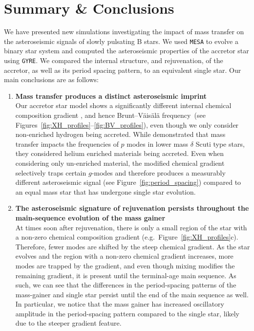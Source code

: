 \documentclass[desactivate]{aa}
\begin{document}
\section{Summary \& Conclusions} \label{sec:conclusion}

We have presented new simulations investigating the impact of mass transfer on the asteroseismic signals of slowly pulsating B stars. We used \texttt{MESA} to evolve a binary star system and computed the asteroseismic properties of the accretor star using \texttt{GYRE}. We compared the internal structure, and rejuvenation, of the accretor, as well as its period spacing pattern, to an equivalent single star. Our main conclusions are as follows:

\begin{enumerate}
    \setlength\itemsep{1em}
    \item \textbf{Mass transfer produces a distinct asteroseismic imprint}\\Our accretor star model shows a significantly different internal chemical composition gradient \citep[e.g.][]{Renzo+2021}, and hence Brunt–Väisälä frequency\ (see Figures~\ref{fig:XH_profiles}--\ref{fig:BV_profiles}), even though we only consider non-enriched hydrogen being accreted. While \citet{Miszuda+2021} demonstrated that mass transfer impacts the frequencies of $p$ modes in lower mass $\delta$ Scuti type stars, they considered helium enriched materials being accreted. Even when considering only un-enriched material, the modified chemical gradient selectively traps certain $g$-modes and therefore produces a measurably different asteroseismic signal (see Figure~\ref{fig:period_spacing}) compared to an equal mass star that has undergone single star evolution.
    \item {\bf The asteroseismic signature of rejuvenation persists throughout the main-sequence evolution of the mass gainer}\\ At times soon after rejuvenation, there is only a small region of the star with a non-zero chemical composition gradient (e.g.\ Figure~\ref{fig:XH_profiles}c). Therefore, fewer modes are shifted by the steep chemical gradient. As the star evolves and the region with a non-zero chemical gradient increases, more modes are trapped by the gradient, and even though mixing modifies the remaining gradient, it is present until the terminal-age main sequence. As such, we can see that the differences in the period-spacing patterns of the mass-gainer and single star persist until the end of the main sequence as well. In particular, we notice that the mass gainer has increased oscillatory amplitude in the period-spacing pattern compared to the single star, likely due to the steeper gradient feature.

\end{enumerate}
\end{document}
